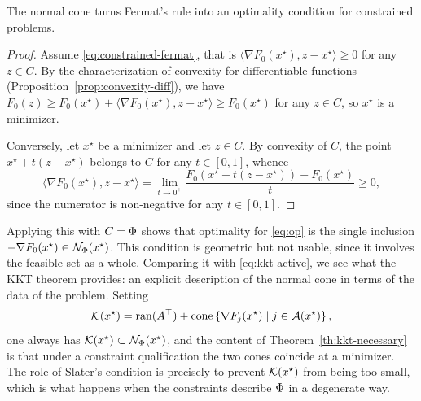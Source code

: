      The normal cone turns Fermat's rule into an optimality condition for constrained problems.


     \begin{proof}
         Assume \eqref{eq:constrained-fermat}, that is $\langle \nabla F_0(x^\star), z-x^\star\rangle\ge 0$ for any $z\in C$. By the characterization of convexity for differentiable functions (Proposition~\ref{prop:convexity-diff}), we have $F_0(z)\ge F_0(x^\star) + \langle \nabla F_0(x^\star), z-x^\star\rangle \ge F_0(x^\star)$ for any $z\in C$, so $x^\star$ is a minimizer.

         Conversely, let $x^\star$ be a minimizer and let $z\in C$. By convexity of $C$, the point $x^\star + t(z-x^\star)$ belongs to $C$ for any $t\in [0,1]$, whence
         \begin{equation}
             \langle \nabla F_0(x^\star), z-x^\star\rangle
             = \lim_{t\to 0^+} \frac{F_0(x^\star+t(z-x^\star)) - F_0(x^\star)}{t} \ge 0,
         \end{equation}
         since the numerator is non-negative for any $t\in[0,1]$.
     \end{proof}

     Applying this with $C=\operatorname{\Phi}$ shows that optimality for \eqref{eq:op} is the single inclusion $-\nabla F_0(x^\star)\in \mathcal{N}_{\operatorname{\Phi}}(x^\star)$. This condition is geometric but not usable, since it involves the feasible set as a whole. Comparing it with \eqref{eq:kkt-active}, we see what the KKT theorem provides: an explicit description of the normal cone in terms of the data of the problem. Setting
     \begin{equation}
         \mathcal{K}(x^\star) = \operatorname{ran}(A^\top) + \operatorname{cone}\left\{ \nabla F_j(x^\star) \mid j\in \mathcal{A}(x^\star) \right\},
     \end{equation}
     one always has $\mathcal{K}(x^\star)\subset \mathcal{N}_{\operatorname{\Phi}}(x^\star)$, and the content of Theorem~\ref{th:kkt-necessary} is that under a constraint qualification the two cones coincide at a minimizer. The role of Slater's condition is precisely to prevent $\mathcal{K}(x^\star)$ from being too small, which is what happens when the constraints describe $\operatorname{\Phi}$ in a degenerate way.

